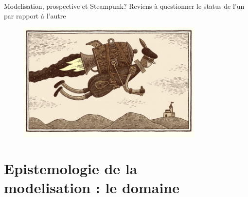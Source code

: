 \documentclass[newPxFont]{beamer}
\begin{document}
\begin{frame}[c]{Modelisation, prospective et Steampunk?}
\vspace{-1cm}
Reviens à questionner le status de l'un par rapport à l'autre
\begin{figure}
  \includegraphics[height=6cm]{img/a_Tom-Gauld-jetpack.jpg}
\end{figure}
\end{frame}

\section{Epistemologie de la\\ modelisation : le domaine}

\end{document}
